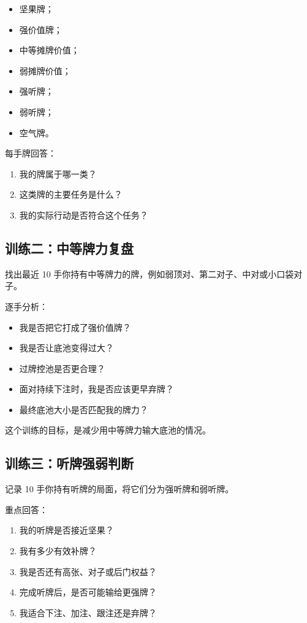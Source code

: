 \begin{itemize}
\item 坚果牌；
\item 强价值牌；
\item 中等摊牌价值；
\item 弱摊牌价值；
\item 强听牌；
\item 弱听牌；
\item 空气牌。
\end{itemize}

每手牌回答：

\begin{enumerate}
\item 我的牌属于哪一类？
\item 这类牌的主要任务是什么？
\item 我的实际行动是否符合这个任务？
\end{enumerate}

\subsection*{训练二：中等牌力复盘}

找出最近 10 手你持有中等牌力的牌，例如弱顶对、第二对子、中对或小口袋对子。

逐手分析：

\begin{itemize}
\item 我是否把它打成了强价值牌？
\item 我是否让底池变得过大？
\item 过牌控池是否更合理？
\item 面对持续下注时，我是否应该更早弃牌？
\item 最终底池大小是否匹配我的牌力？
\end{itemize}

这个训练的目标，是减少用中等牌力输大底池的情况。

\subsection*{训练三：听牌强弱判断}

记录 10 手你持有听牌的局面，将它们分为强听牌和弱听牌。

重点回答：

\begin{enumerate}
\item 我的听牌是否接近坚果？
\item 我有多少有效补牌？
\item 我是否还有高张、对子或后门权益？
\item 完成听牌后，是否可能输给更强牌？
\item 我适合下注、加注、跟注还是弃牌？
\end{enumerate}


